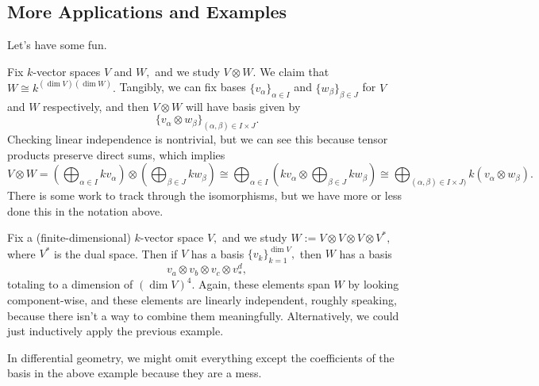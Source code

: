 \documentclass[../notes.tex]{subfiles}
\begin{document}
\subsection{More Applications and Examples}
Let's have some fun.
\begin{example}
	Fix $k$-vector spaces $V$ and $W,$ and we study $V\otimes W.$ We claim that $W\cong k^{(\dim V)(\dim W)}.$ Tangibly, we can fix bases $\{v_\alpha\}_{\alpha\in I}$ and $\{w_\beta\}_{\beta\in J}$ for $V$ and $W$ respectively, and then $V\otimes W$ will have basis given by
	\[\{v_\alpha\otimes w_\beta\}_{(\alpha,\beta)\in I\times J}.\]
	Checking linear independence is nontrivial, but we can see this because tensor products preserve direct sums, which implies
	\[V\otimes W=\left(\bigoplus_{\alpha\in I}kv_\alpha\right)\otimes\left(\bigoplus_{\beta\in J}kw_\beta\right)\cong\bigoplus_{\alpha\in I}\left(kv_\alpha\otimes\bigoplus_{\beta\in J}kw_\beta\right)\cong\bigoplus_{(\alpha,\beta)\in I\times J)}k(v_\alpha\otimes w_\beta).\]
	There is some work to track through the isomorphisms, but we have more or less done this in the notation above.
\end{example}
\begin{example}
	Fix a (finite-dimensional) $k$-vector space $V,$ and we study $W:=V\otimes V\otimes V\otimes V^*,$ where $V^*$ is the dual space. Then if $V$ has a basis $\{v_k\}_{k=1}^{\dim V},$ then $W$ has a basis
	\[v_a\otimes v_b\otimes v_c\otimes v_*^d,\]
	totaling to a dimension of $(\dim V)^4.$ Again, these elements span $W$ by looking component-wise, and these elements are linearly independent, roughly speaking, because there isn't a way to combine them meaningfully. Alternatively, we could just inductively apply the previous example.
\end{example}
In differential geometry, we might omit everything except the coefficients of the basis in the above example because they are a mess.
\end{document}
